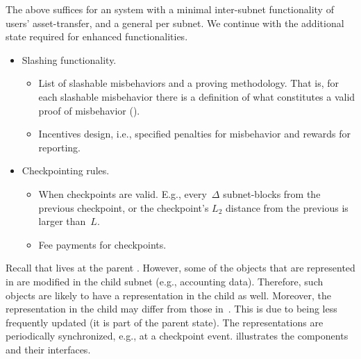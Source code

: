 %
The above suffices for an \ipcFull system with a minimal inter-subnet functionality of users' asset-transfer, and a general \smr per subnet. We continue with the additional state required for enhanced functionalities.
%
\begin{itemize}
    \item Slashing functionality.
    \begin{itemize}
        \item List of slashable misbehaviors and a proving methodology. That is, for each slashable misbehavior there is a definition of what constitutes a valid proof of misbehavior (\pom).
        \item Incentives design, i.e., specified penalties for misbehavior and rewards for reporting.
    \end{itemize}
    \item Checkpointing rules.
    \begin{itemize}
        \item When checkpoints are valid. E.g., every~$\Delta$ subnet-blocks from the previous checkpoint, or the checkpoint's $L_2$ distance from the previous is larger than~$L$.
        \item Fee payments for checkpoints.
    \end{itemize}
\end{itemize}
Recall that \sa lives at the parent \smr. However, some of the objects that are represented in \sa are modified in the child subnet (e.g., accounting data). Therefore, such objects are likely to have a representation in the child \smr as well.
Moreover, the representation in the child \smr may differ from those in~\sa. This is due to \sa being less frequently updated (it is part of the parent \smr state). The representations are periodically synchronized, e.g., at a checkpoint event.  illustrates the components and their interfaces.\\



